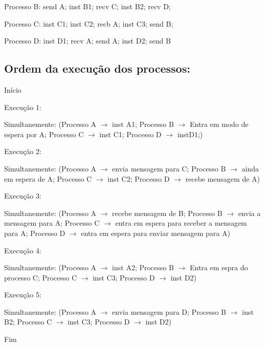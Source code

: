 \documentclass{article}
\begin{document}
    Processo B: send A; inst B1; recv C; inst B2; recv D; 

    Processo C: inst C1; inst C2; recb A; inst C3; send B; 
    
    Processo D: inst D1; recv A; send A; inst D2; send B

    \subsection*{Ordem da execução dos processos:}

    Início
    
    Execução 1: 
    
    Simultanemente: (Processo A $\rightarrow$ inst A1; Processo B $\rightarrow$ Entra em modo de espera por A;
    Processo C $\rightarrow$ inst C1; Processo D $\rightarrow$ instD1;) 

    Execução 2:

    Simultanemente: (Processo A $\rightarrow$ envia mensagem para C; Processo B $\rightarrow$ ainda em espera de A;
    Processo C $\rightarrow$  inst C2; Processo D $\rightarrow$ recebe mensagem de A)

    Execução 3:

    Simultanemente: (Processo A $\rightarrow$ recebe mensagem de B; Processo B $\rightarrow$  envia a mensagem
    para A; Processo C $\rightarrow$ entra em espera para receber a mensagem para A; Processo D $\rightarrow$ 
    entra em espera para enviar mensagem para A)

    Execução 4:

    Simultanemente: (Processo A $\rightarrow$ inst A2; Processo B $\rightarrow$ Entra em espra do processo C; 
    Processo C $\rightarrow$ inst C3; Processo D $\rightarrow$ inst D2)

    Execução 5:

    Simultanemente: (Processo A $\rightarrow$ envia mensagem para D; Processo B $\rightarrow$ inst B2; 
    Processo C $\rightarrow$ inst C3; Processo D $\rightarrow$ inst D2)

    Fim
\end{document}
